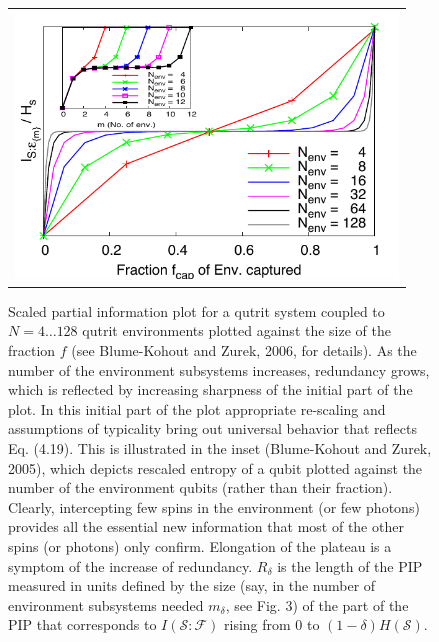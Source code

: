 \documentclass[aps,rmp,floatfix,11pt]{revtex4}
\def\FCW{4in}
\newcommand{\cS}        {{\mathcal S}}
\newcommand{\+}         {\dagger}
\newcommand\cF{{\mathcal F}}
\begin{document}
{\begin{figure}[tb]
\begin{tabular}{l}
\vspace{-0.15in} 
\includegraphics[width=\FCW]{NSPIPs_3x3.pdf}\\
\end{tabular}
\caption{Scaled partial information plot for a qutrit system coupled to $N=4\ldots128$ qutrit 
environments plotted against the size of the fraction $f$ (see Blume-Kohout and Zurek, 2006, 
for details). As the number of the environment subsystems increases, redundancy grows, which 
is reflected by increasing sharpness of the initial part of the plot. In this initial part of the plot 
appropriate re-scaling and assumptions of typicality bring out universal behavior that reflects 
Eq. (4.19). This is illustrated in the inset (Blume-Kohout and Zurek, 2005), which depicts rescaled 
entropy of a qubit plotted against the number of the environment qubits (rather than their fraction). Clearly, intercepting few 
spins in the environment (or few photons) provides all the essential new information that most 
of the other spins (or photons) only confirm. Elongation of the plateau is a symptom of the increase 
of redundancy. $R_\delta$ is the length of the PIP measured in units defined by the size 
(say, in the number of environment subsystems needed $m_\delta$, see Fig. 3) of the part  
of the PIP that corresponds to $I(\cS:\cF)$ rising from 0 to $(1-\delta) H(\cS)$. 
}
\label{SpinPIP}
\end{figure}


}
\end{document}
